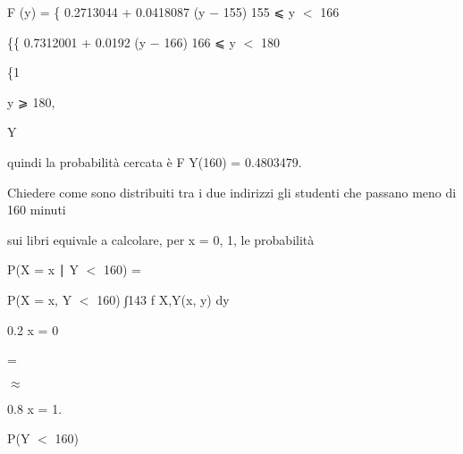 \documentclass[a4paper,portrait,12pt]{article}
\begin{document}
\begin{flushleft}
F (y) = \{ 0.2713044 + 0.0418087 (y $-$ 155) 155 ⩽ y $<$ 166
\end{flushleft}


\begin{flushleft}
\{\{ 0.7312001 + 0.0192 (y $-$ 166) 166 ⩽ y $<$ 180
\end{flushleft}


\{1


\begin{flushleft}
y ⩾ 180,
\end{flushleft}


\begin{flushleft}
Y
\end{flushleft}





\begin{flushleft}
quindi la probabilit\`{a} cercata \`{e} F Y(160) = 0.4803479.
\end{flushleft}


\begin{flushleft}
Chiedere come sono distribuiti tra i due indirizzi gli studenti che passano meno di 160 minuti
\end{flushleft}


\begin{flushleft}
sui libri equivale a calcolare, per x = 0, 1, le probabilit\`{a}
\end{flushleft}


\begin{flushleft}
P(X = x ∣ Y $<$ 160) =
\end{flushleft}





\begin{flushleft}
P(X = x, Y $<$ 160) ∫143 f X,Y(x, y) dy
\end{flushleft}


\begin{flushleft}
0.2 x = 0
\end{flushleft}


=


$\approx$


\begin{flushleft}
0.8 x = 1.
\end{flushleft}


\begin{flushleft}
P(Y $<$ 160)
\end{flushleft}
\end{document}
